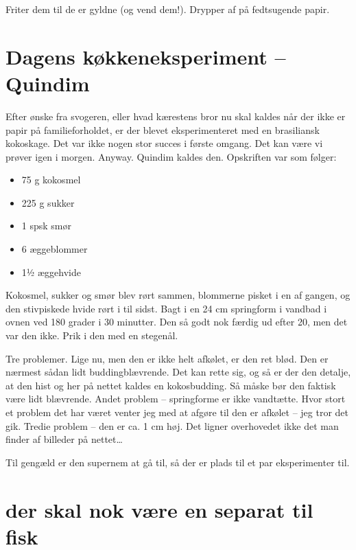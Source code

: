 \documentclass[
]{book}
\providecommand{\tightlist}{%
  \setlength{\itemsep}{0pt}\setlength{\parskip}{0pt}}
\begin{document}
Friter dem til de er gyldne (og vend dem!). Drypper af på fedtsugende papir.

\hypertarget{dagens-kuxf8kkeneksperiment-quindim}{%
\section{Dagens køkkeneksperiment -- Quindim}\label{dagens-kuxf8kkeneksperiment-quindim}}

Efter ønske fra svogeren, eller hvad kærestens bror nu skal kaldes når der ikke er papir på familieforholdet, er der blevet eksperimenteret med en brasiliansk kokoskage. Det var ikke nogen stor succes i første omgang. Det kan være vi prøver igen i morgen. Anyway. Quindim kaldes den. Opskriften var som følger:

\begin{itemize}
\tightlist
\item
  75 g kokosmel
\item
  225 g sukker
\item
  1 spsk smør
\item
  6 æggeblommer
\item
  1½ æggehvide
\end{itemize}

Kokosmel, sukker og smør blev rørt sammen, blommerne pisket i en af gangen, og den stivpiskede hvide rørt i til sidst. Bagt i en 24 cm springform i vandbad i ovnen ved 180 grader i 30 minutter. Den så godt nok færdig ud efter 20, men det var den ikke. Prik i den med en stegenål.

Tre problemer. Lige nu, men den er ikke helt afkølet, er den ret blød. Den er nærmest sådan lidt buddingblævrende. Det kan rette sig, og så er der den detalje, at den hist og her på nettet kaldes en kokosbudding. Så måske bør den faktisk være lidt blævrende. Andet problem -- springforme er ikke vandtætte. Hvor stort et problem det har været venter jeg med at afgøre til den er afkølet -- jeg tror det gik. Tredie problem -- den er ca. 1 cm høj. Det ligner overhovedet ikke det man finder af billeder på nettet\ldots{}

Til gengæld er den supernem at gå til, så der er plads til et par eksperimenter til.

\hypertarget{der-skal-nok-vuxe6re-en-separat-til-fisk}{%
\section{der skal nok være en separat til fisk}\label{der-skal-nok-vuxe6re-en-separat-til-fisk}}
\end{document}
